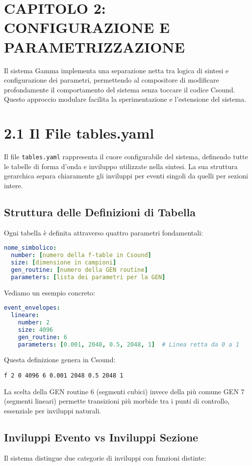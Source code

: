 
\section{CAPITOLO 2: CONFIGURAZIONE E PARAMETRIZZAZIONE}
Il sistema Gamma implementa una separazione netta tra logica di sintesi e configurazione dei parametri, permettendo al compositore di modificare profondamente il comportamento del sistema senza toccare il codice Csound. Questo approccio modulare facilita la sperimentazione e l'estensione del sistema.
\section{2.1 Il File tables.yaml}
Il file \texttt{tables.yaml} rappresenta il cuore configurabile del sistema, definendo tutte le tabelle di forma d'onda e inviluppo utilizzate nella sintesi. La sua struttura gerarchica separa chiaramente gli inviluppi per eventi singoli da quelli per sezioni intere.
\subsection{Struttura delle Definizioni di Tabella}
Ogni tabella è definita attraverso quattro parametri fondamentali:

\begin{lstlisting}[language=Yaml]
nome_simbolico:
  number: [numero della f-table in Csound]
  size: [dimensione in campioni]
  gen_routine: [numero della GEN routine]
  parameters: [lista dei parametri per la GEN]
\end{lstlisting}

Vediamo un esempio concreto:

\begin{lstlisting}[language=Yaml]
event_envelopes:
  lineare:
    number: 2
    size: 4096
    gen_routine: 6
    parameters: [0.001, 2048, 0.5, 2048, 1]  # Linea retta da 0 a 1
\end{lstlisting}

Questa definizione genera in Csound:
\begin{lstlisting}[language=Csound]
f 2 0 4096 6 0.001 2048 0.5 2048 1
\end{lstlisting}

La scelta della GEN routine 6 (segmenti cubici) invece della più comune GEN 7 (segmenti lineari) permette transizioni più morbide tra i punti di controllo, essenziale per inviluppi naturali.
\subsection{Inviluppi Evento vs Inviluppi Sezione}
Il sistema distingue due categorie di inviluppi con funzioni distinte:

